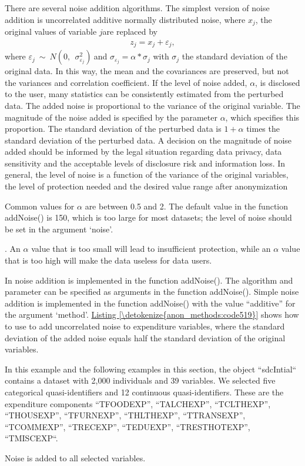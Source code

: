\documentclass[letterpaper,10pt,english]{sphinxmanual}
\begin{document}
There are several noise addition algorithms. The simplest version of
noise addition is uncorrelated additive normally distributed noise,
where \(x_{j}\), the original values of variable
\(j\)are replaced by
\begin{equation*}
\begin{split}z_{j} = x_{j} + \varepsilon_{j},\end{split}
\end{equation*}
where
\(\varepsilon_{j}\ \sim\ N(0,\ \ \sigma_{\varepsilon_{j}}^{2})\ \)and
\(\sigma_{\varepsilon_{j}} = \alpha * \sigma_{j}\) with
\(\sigma_{j}\) the standard deviation of the original data. In this
way, the mean and the covariances are preserved, but not the variances
and correlation coefficient. If the level of noise added,
\(\alpha\), is disclosed to the user, many statistics can be
consistently estimated from the perturbed data. The added noise is
proportional to the variance of the original variable. The magnitude of
the noise added is specified by the parameter \(\alpha\), which
specifies this proportion. The standard deviation of the perturbed data
is \(1 + \alpha\) times the standard deviation of the perturbed
data. A decision on the magnitude of noise added should be informed by
the legal situation regarding data privacy, data sensitivity and the
acceptable levels of disclosure risk and information loss. In general,
the level of noise is a function of the variance of the original
variables, the level of protection needed and the desired value range
after anonymization %
\begin{footnote}[18]\sphinxAtStartFootnote
Common values for \(\alpha\) are between 0.5 and 2. The default
value in the  function addNoise() is 150, which is too
large for most datasets; the level of noise should be set in the
argument ‘noise’.
%
\end{footnote}. An \(\alpha\) value that
is too small will lead to insufficient protection, while an
\(\alpha\) value that is too high will make the data useless for
data users.

In  noise addition is implemented in the function addNoise().
The algorithm and parameter can be specified as arguments in the
function addNoise(). Simple noise addition is implemented in the
function addNoise() with the value “additive” for the argument ‘method’.
\hyperref[\detokenize{anon_methods:code519}]{Listing \ref{\detokenize{anon_methods:code519}}} shows how to use  to add uncorrelated noise to
expenditure variables, where the standard deviation of the added noise
equals half the standard deviation of the original
variables. %
\begin{footnote}[19]\sphinxAtStartFootnote
In this example and the following examples in this section, the
 object “sdcIntial“ contains a dataset with 2,000
individuals and 39 variables. We selected five categorical
quasi-identifiers and 12 continuous quasi-identifiers. These are the
expenditure components “TFOODEXP”, “TALCHEXP”, “TCLTHEXP”,
“THOUSEXP”, “TFURNEXP”, “THLTHEXP”, “TTRANSEXP”, “TCOMMEXP”,
“TRECEXP”, “TEDUEXP”, “TRESTHOTEXP”, “TMISCEXP“.
%
\end{footnote} Noise is added to all selected
variables.
\end{document}
